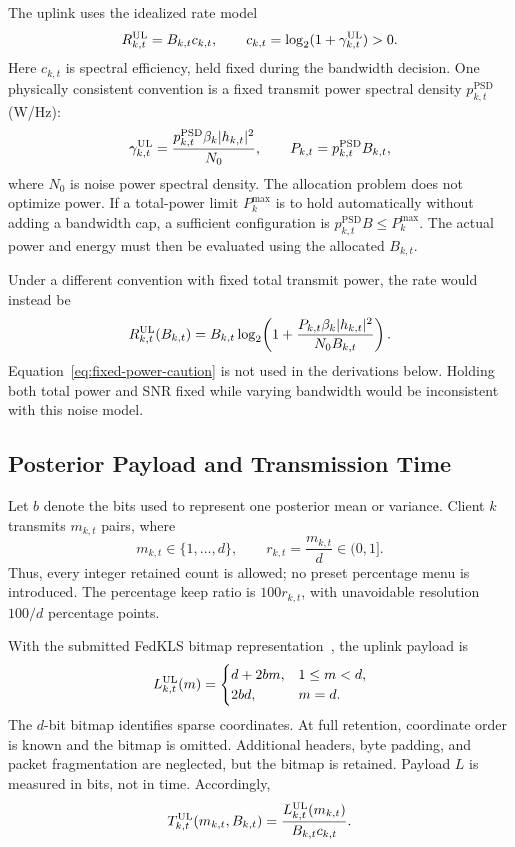 The uplink uses the idealized rate model
\begin{equation}
 R_{k,t}^{\mathrm{UL}}=B_{k,t}c_{k,t},\qquad
 c_{k,t}=\log_2(1+\gamma_{k,t}^{\mathrm{UL}})>0.
 \label{eq:rate}
\end{equation}
Here $c_{k,t}$ is spectral efficiency, held fixed during the bandwidth decision. One physically consistent convention is a fixed transmit power spectral density $p_{k,t}^{\mathrm{PSD}}$ (W/Hz):
\begin{equation}
 \gamma_{k,t}^{\mathrm{UL}}
 =\frac{p_{k,t}^{\mathrm{PSD}}\beta_k|h_{k,t}|^2}{N_0},
 \qquad P_{k,t}=p_{k,t}^{\mathrm{PSD}}B_{k,t},
 \label{eq:snr-psd}
\end{equation}
where $N_0$ is noise power spectral density. The allocation problem does not optimize power. If a total-power limit $P_k^{\max}$ is to hold automatically without adding a bandwidth cap, a sufficient configuration is $p_{k,t}^{\mathrm{PSD}}B\le P_k^{\max}$. The actual power and energy must then be evaluated using the allocated $B_{k,t}$.

Under a different convention with fixed total transmit power, the rate would instead be
\begin{equation}
 R_{k,t}^{\mathrm{UL}}(B_{k,t})
 =B_{k,t}\log_2\!\left(1+
 \frac{P_{k,t}\beta_k|h_{k,t}|^2}{N_0B_{k,t}}\right).
 \label{eq:fixed-power-caution}
\end{equation}
Equation~\eqref{eq:fixed-power-caution} is not used in the derivations below. Holding both total power and SNR fixed while varying bandwidth would be inconsistent with this noise model.

\subsection{Posterior Payload and Transmission Time}
Let $b$ denote the bits used to represent one posterior mean or variance. Client $k$ transmits $m_{k,t}$ pairs, where
\begin{equation}
 m_{k,t}\in\{1,\ldots,d\},\qquad
 r_{k,t}=\frac{m_{k,t}}{d}\in(0,1].
 \label{eq:retention}
\end{equation}
Thus, every integer retained count is allowed; no preset percentage menu is introduced. The percentage keep ratio is $100r_{k,t}$, with unavoidable resolution $100/d$ percentage points.

With the submitted FedKLS bitmap representation~\cite[Sec.~II-B]{fedkls}, the uplink payload is
\begin{equation}
 L_{k,t}^{\mathrm{UL}}(m)=
 \begin{cases}
 d+2bm,&1\le m<d,\\
 2bd,&m=d.
 \end{cases}
 \label{eq:uplink-payload}
\end{equation}
The $d$-bit bitmap identifies sparse coordinates. At full retention, coordinate order is known and the bitmap is omitted. Additional headers, byte padding, and packet fragmentation are neglected, but the bitmap is retained. Payload $L$ is measured in bits, not in time. Accordingly,
\begin{equation}
 T_{k,t}^{\mathrm{UL}}(m_{k,t},B_{k,t})
 =\frac{L_{k,t}^{\mathrm{UL}}(m_{k,t})}{B_{k,t}c_{k,t}}.
 \label{eq:upload-time}
\end{equation}

